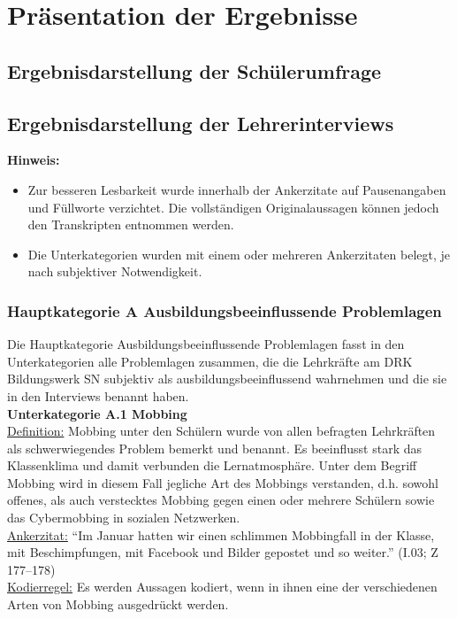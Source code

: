 \section{Präsentation der Ergebnisse}
\label{sec:PräsentationDerErgebnisse}

\subsection{Ergebnisdarstellung der Schülerumfrage}
\label{sec:ErgebnisdarstellungDerSchülerumfrage}

\subsection{Ergebnisdarstellung der Lehrerinterviews}
\label{sec:ErgebnisdarstellungDerLehrerinterviews}

\textbf{Hinweis:} 
\begin{itemize}
	\item Zur besseren Lesbarkeit wurde innerhalb der Ankerzitate auf Pausenangaben und Füllworte verzichtet. Die vollständigen Originalaussagen können jedoch den Transkripten entnommen werden.
	\item Die Unterkategorien wurden mit einem oder mehreren Ankerzitaten belegt, je nach subjektiver Notwendigkeit.
\end{itemize}


\subsubsection{Hauptkategorie A Ausbildungsbeeinflussende Problemlagen}
\label{sec:HauptkategorieAAusbildungsbeeinflussendeProblemlagen}

Die Hauptkategorie Ausbildungsbeeinflussende Problemlagen fasst in den Unterkategorien alle Problemlagen zusammen, die die Lehrkräfte am DRK Bildungswerk SN subjektiv als ausbildungsbeeinflussend wahrnehmen und die sie in den Interviews benannt haben.\\

\textbf{Unterkategorie A.1 Mobbing}\\
\underline{Definition:} Mobbing unter den Schülern wurde von allen befragten Lehrkräften als schwerwiegendes Problem bemerkt und benannt. Es beeinflusst stark das Klassenklima und damit verbunden die Lernatmosphäre. Unter dem Begriff Mobbing wird in diesem Fall jegliche Art des Mobbings verstanden, d.h. sowohl offenes, als auch verstecktes Mobbing gegen einen oder mehrere Schülern sowie das Cybermobbing in sozialen Netzwerken.\\
\underline{Ankerzitat:} "`Im Januar hatten wir einen schlimmen Mobbingfall in der Klasse, mit Beschimpfungen, mit Facebook und Bilder gepostet und so weiter."' (I.03; Z 177--178)\\
\underline{Kodierregel:} Es werden Aussagen kodiert, wenn in ihnen eine der verschiedenen Arten von Mobbing ausgedrückt werden.\\

